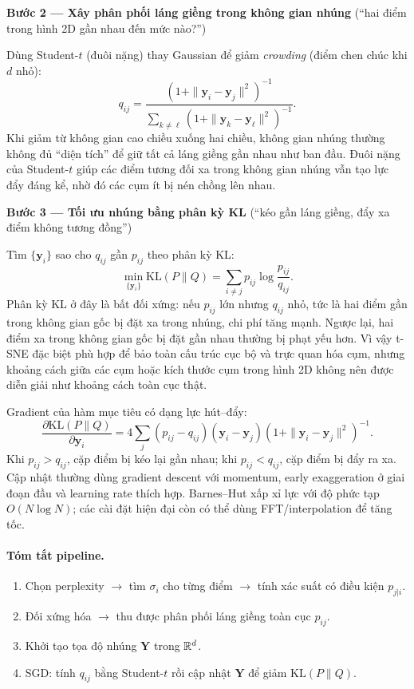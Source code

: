 \textbf{Bước 2 --- Xây phân phối láng giềng trong không gian nhúng} (``hai điểm trong hình 2D gần nhau đến mức nào?'')

Dùng Student-$t$ (đuôi nặng) thay Gaussian để giảm \emph{crowding} (điểm chen chúc khi $d$ nhỏ):
\[
q_{ij} = \frac{\left(1 + \|\mathbf{y}_i - \mathbf{y}_j\|^2\right)^{-1}}
{\sum_{k \neq \ell} \left(1 + \|\mathbf{y}_k - \mathbf{y}_\ell\|^2\right)^{-1}}.
\]
Khi giảm từ không gian cao chiều xuống hai chiều, không gian nhúng thường không
đủ ``diện tích'' để giữ tất cả láng giềng gần nhau như ban đầu. Đuôi nặng của
Student-$t$ giúp các điểm tương đối xa trong không gian nhúng vẫn tạo lực đẩy
đáng kể, nhờ đó các cụm ít bị nén chồng lên nhau.

\textbf{Bước 3 --- Tối ưu nhúng bằng phân kỳ KL} (``kéo gần láng giềng, đẩy xa điểm không tương đồng'')

Tìm $\{\mathbf{y}_i\}$ sao cho $q_{ij}$ gần $p_{ij}$ theo phân kỳ KL:
\[
\min_{\{\mathbf{y}_i\}} \mathrm{KL}(P \| Q) = \sum_{i \neq j} p_{ij} \log \frac{p_{ij}}{q_{ij}}.
\]
Phân kỳ KL ở đây là bất đối xứng: nếu $p_{ij}$ lớn nhưng $q_{ij}$ nhỏ, tức là
hai điểm gần trong không gian gốc bị đặt xa trong nhúng, chi phí tăng mạnh.
Ngược lại, hai điểm xa trong không gian gốc bị đặt gần nhau thường bị phạt yếu
hơn. Vì vậy t-SNE đặc biệt phù hợp để bảo toàn cấu trúc cục bộ và trực quan hóa
cụm, nhưng khoảng cách giữa các cụm hoặc kích thước cụm trong hình 2D không nên
được diễn giải như khoảng cách toàn cục thật.

Gradient của hàm mục tiêu có dạng lực hút--đẩy:
\[
  \frac{\partial \mathrm{KL}(P\|Q)}{\partial \mathbf{y}_i}
  =
  4 \sum_j (p_{ij}-q_{ij})
  (\mathbf{y}_i-\mathbf{y}_j)
  \left(1+\|\mathbf{y}_i-\mathbf{y}_j\|^2\right)^{-1}.
\]
Khi $p_{ij} > q_{ij}$, cặp điểm bị kéo lại gần nhau; khi $p_{ij} < q_{ij}$,
cặp điểm bị đẩy ra xa. Cập nhật thường dùng gradient descent với momentum,
early exaggeration ở giai đoạn đầu và learning rate thích hợp. Barnes--Hut
xấp xỉ lực với độ phức tạp $O(N \log N)$; các cài đặt hiện đại còn có thể dùng
FFT/interpolation để tăng tốc.

\paragraph{Tóm tắt pipeline.}
\begin{enumerate}
  \item Chọn perplexity $\to$ tìm $\sigma_i$ cho từng điểm $\to$ tính xác suất có điều kiện $p_{j|i}$.
  \item Đối xứng hóa $\to$ thu được phân phối láng giềng toàn cục $p_{ij}$.
  \item Khởi tạo tọa độ nhúng $\mathbf{Y}$ trong $\mathbb{R}^d$.
  \item SGD: tính $q_{ij}$ bằng Student-$t$ rồi cập nhật $\mathbf{Y}$ để giảm $\mathrm{KL}(P\|Q)$.
\end{enumerate}

